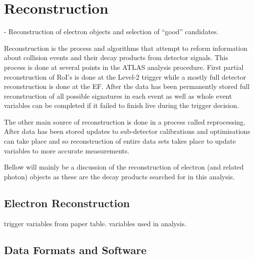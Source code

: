 \chapter{Reconstruction}
{\normalsize - Reconstruction of electron objects and selection of ``good'' candidates.}

Reconstruction is the process and algorithms that attempt to reform information about collision events and their decay products from detector signals. This process is done at several points in the ATLAS analysis procedure. First partial reconstruction of RoI's is done at the Level-2 trigger while a mostly full detector reconstruction is done at the EF. After the data has been permanently stored full reconstruction of all possible signatures in each event as well as whole event variables can be completed if it failed to finish live during the trigger decision.

The other main source of reconstruction is done in a process called reprocessing. After data has been stored updates to sub-detector calibrations and optimisations can take place and so reconstruction of entire data sets takes place to update variables to more accurate measurements. 


Bellow will mainly be a discussion of the reconstruction of electron (and related photon) objects as these are the decay products searched for in this analysis.



\section{Electron Reconstruction}




	trigger variables from paper table.
	variables used in analysis.
	



\section{Data Formats and Software}